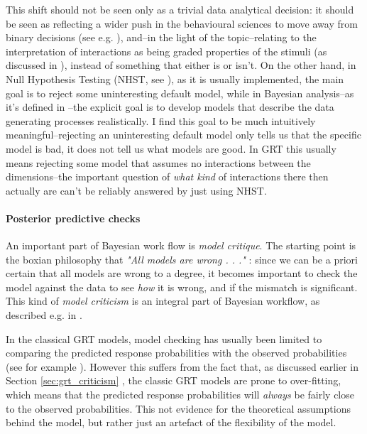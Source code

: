 \documentclass{article}\usepackage{knitr}
\begin{document}
This shift should not be seen only as a trivial data analytical decision: it should be seen as reflecting a wider push in the behavioural sciences to move away from binary decisions (see e.g. \citet{amrhein2017}), and--in the light of the topic--relating to the interpretation of interactions as being graded properties of the stimuli (as discussed in \citet{kemler1993}), instead of something that either is or isn't. On the other hand, in Null Hypothesis Testing (NHST, see \citet[Chapter 11]{kruschke2015}), as it is usually implemented, the main goal is to reject some uninteresting default model, while in Bayesian analysis--as it's defined in \citet{bda}--the explicit goal is to develop models that describe the data generating processes realistically. I find this goal to be much intuitively meaningful--rejecting an uninteresting default model only tells us that the specific model is bad, it does not tell us what models are good. In GRT this usually means rejecting some model that assumes no interactions between the dimensions--the important question of \textit{what kind} of interactions there then actually are can't be reliably answered by just using NHST.

\paragraph{Posterior predictive checks}

An important part of Bayesian work flow is \textit{model critique}. The starting point is the boxian philosophy that \textit{"All models are wrong . . ."} \citep{box2005}: since we can be a priori certain that all models are wrong to a degree, it becomes important to check the model against the data to see \textit{how} it is wrong, and if the mismatch is significant. This kind of \textit{model criticism} is an integral part of Bayesian workflow, as described e.g. in \citet[Part II]{bda}.

In the classical GRT models, model checking has usually been limited to comparing the predicted response probabilities with the observed probabilities (see for example \citet[Figure 4]{silbert2009}).  However this suffers from the fact that, as discussed earlier in Section \ref{sec:grt_criticism} \textit{}, the classic GRT models are prone to over-fitting, which means that the predicted response probabilities will \textit{always} be fairly close to the observed probabilities. This not evidence for the theoretical assumptions behind the model, but rather just an artefact of the flexibility of the model.
\end{document}
